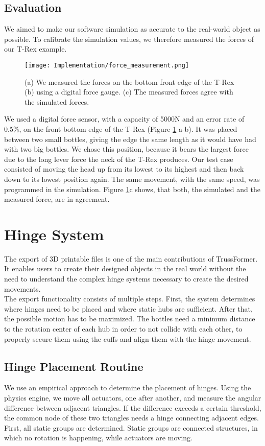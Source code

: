 \subsection{Evaluation}
We aimed to make our software simulation as accurate to the real-world object as possible. To calibrate the simulation values, we therefore measured the forces of our T-Rex example.\\
\begin{figure}[h!]
    \texttt{[image: Implementation/force\_measurement.png]}
    \centering
    \caption{(a) We measured the forces on the bottom front edge of the T-Rex (b) using a digital force gauge. (c) The measured forces agree with the simulated forces.}
    \label{fig:force_measurement}
\end{figure}
We used a digital force sensor, with a capacity of 5000N and an error rate of 0.5\%, on the front bottom edge of the T-Rex (Figure \ref{fig:force_measurement} a-b). It was placed between two small bottles, giving the edge the same length as it would have had with two big bottles. We chose this position, because it bears the largest force due to the long lever force the neck of the T-Rex produces. Our test case consisted of moving the head up from its lowest to its highest and then back down to its lowest position again. The same movement, with the same speed, was programmed in the simulation. Figure \ref{fig:force_measurement}c shows, that both, the simulated and the measured force, are in agreement.

\section{Hinge System}
The export of 3D printable files is one of the main contributions of TrussFormer. It enables users to create their designed objects in the real world without the need to understand the complex hinge systems necessary to create the desired movements.\\
The export functionality consists of multiple steps. First, the system determines where hinges need to be placed and where static hubs are sufficient. After that, the possible motion has to be maximized. The bottles need a minimum distance to the rotation center of each hub in order to not collide with each other, to properly secure them using the cuffs and align them with the hinge movement.

\subsection{Hinge Placement Routine}\label{sec:hinge_placement_impl}
We use an empirical approach to determine the placement of hinges. Using the physics engine, we move all actuators, one after another, and measure the angular difference between adjacent triangles. If the difference exceeds a certain threshold, the common node of these two triangles needs a hinge connecting adjacent edges.\\
First, all static groups are determined. Static groups are connected structures, in which no rotation is happening, while actuators are moving.


